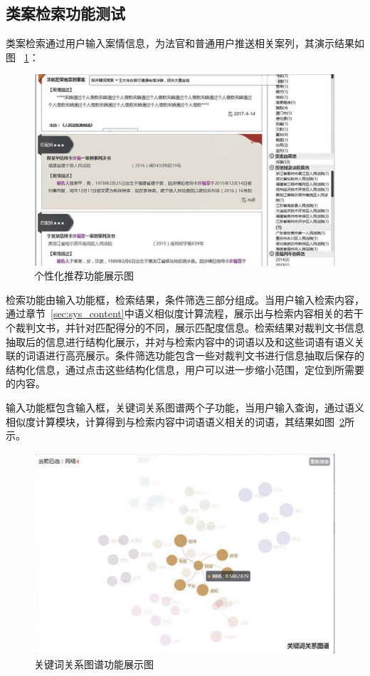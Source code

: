 \subsection{类案检索功能测试}
类案检索通过用户输入案情信息，为法官和普通用户推送相关案列，其演示结果如图
~\ref{fig:sys_search}：
\begin{figure}[htbp]%
    \centering
    \includegraphics[scale=0.4, clip=true]{./sources/sys_search.eps}
    \caption{\label{fig:sys_search}个性化推荐功能展示图}
\end{figure}

检索功能由输入功能框，检索结果，条件筛选三部分组成。当用户输入检索内容，通过章节~\ref{sec:sys_content}中语义相似度计算流程，展示出与检索内容相关的若干个裁判文书，并针对匹配得分的不同，展示匹配度信息。检索结果对裁判文书信息抽取后的信息进行结构化展示，并对与检索内容中的词语以及和这些词语有语义关联的词语进行高亮展示。条件筛选功能包含一些对裁判文书进行信息抽取后保存的结构化信息，通过点击这些结构化信息，用户可以进一步缩小范围，定位到所需要的内容。

输入功能框包含输入框，关键词关系图谱两个子功能，当用户输入查询，通过语义相似度计算模块，计算得到与检索内容中词语语义相关的词语，其结果如图~\ref{fig:sys_word}所示。
\begin{figure}[htbp]%
    \centering
    \includegraphics[scale=0.4, clip=true]{./sources/sys_word.eps}
    \caption{\label{fig:sys_word}关键词关系图谱功能展示图}
\end{figure}


